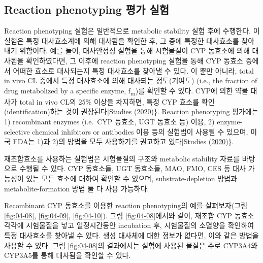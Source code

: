 \documentclass[
  11pt,
  krantz2, a4paper, twoside]{krantz}
\begin{document}
\hypertarget{reaction-phenotyping-uxd3c9uxac00-uxc2e4uxd5d8}{%
\subsection{Reaction phenotyping 평가 실험}\label{reaction-phenotyping-uxd3c9uxac00-uxc2e4uxd5d8}}

Reaction phenotyping 실험은 일반적으로 metabolic stability 실험 후에
수행한다. 이 실험은 특정 대사효소계에 의해 대사됨을 확인한 후, 그 중에
특정한 대사효소를 찾아내기 위함이다. 예를 들어, 대사안정성 실험을 통해
시험물질이 CYP 동효소에 의해 대사됨을 확인하였다면, 그 이후에 reaction
phenotyping 실험을 통해 CYP 동효소 중에서 어떠한 효소로 대사되는지 특정
대사효소를 찾아낼 수 있다. 이 뿐만 아니라, total in vivo CL 중에서 특정
대사효소에 의해 대사되는 정도(기여도) (i.e., the fraction of drug
metabolized by a specific enzyme, f\textsubscript{m})를 확인할 수 있다. CYP에 의한
약물 대사가 total in vivo CL의 25\% 이상을 차지하면, 특정 CYP 효소를
확인(identification)하는 것이 권장된다{[}Studies (\protect\hyperlink{ref-studies2020cytochrome}{2020})\}. Reaction phenotyping
평가에는 1) recombinant enzymes (i.e.~CYP 동효소, UGT 동효소 등) 이용,
2) enzyme-selective chemical inhibitors or antibodies 이용 등의 실험법이
사용될 수 있으며, 미국 FDA는 1)과 2)의 방법을 모두 사용하기를 권고하고
있다{[}Studies (\protect\hyperlink{ref-studies2020cytochrome}{2020})\}.

재조합효소를 사용하는 실험법은 시험물질의 구조와 metabolic stability
자료를 바탕으로 수행될 수 있다. CYP 동효소들, UGT 동효소들, MAO, FMO,
CES 등 대사 가능성이 있는 모든 효소에 대하여 확인할 수 있으며,
substrate-depletion 방법과 metabolite-formation 방법 둘 다 사용
가능하다.

Recombinant CYP 동효소를 이용한 reaction phenotyping의 예를
살펴보자(그림 \ref{fig:04-08}, \ref{fig:04-09}, \ref{fig:04-10}). 그림 \ref{fig:04-08}에서와 같이, 재조합 CYP 동효소 각각에
시험물질을 넣고 일정시간동안 incubation 후, 시험물질의 소멸양을 확인하여
특정 대사효소를 찾아낼 수 있다. 생성 대사체에 대한 정보가 없다면, 이와
같은 방법을 사용할 수 있다. 그림 \ref{fig:04-08}의 결과에서는 실험에 사용된 물질은
주로 CYP3A4와 CYP3A5를 통해 대사됨을 확인할 수 있다.
\end{document}
